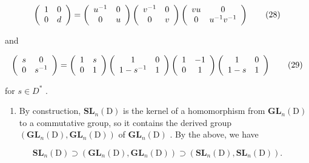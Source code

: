 \[
\left( \begin{array}{c c} 1 & 0 \\ 0 & d \end{array} \right) = \left( \begin{array}{c c} u ^ {- 1} & 0 \\ 0 & u \end{array} \right) \left( \begin{array}{c c} v ^ {- 1} & 0 \\ 0 & v \end{array} \right) \left( \begin{array}{c c} v u & 0 \\ 0 & u ^ {- 1} v ^ {- 1} \end{array} \right)\tag{28}
\]

and

\[
\left( \begin{array}{c c} s & 0 \\ 0 & s ^ {- 1} \end{array} \right) = \left( \begin{array}{c c} 1 & s \\ 0 & 1 \end{array} \right) \left( \begin{array}{c c} 1 & 0 \\ 1 - s ^ {- 1} & 1 \end{array} \right) \left( \begin{array}{c c} 1 & - 1 \\ 0 & 1 \end{array} \right) \left( \begin{array}{c c} 1 & 0 \\ 1 - s & 1 \end{array} \right)\tag{29}
\]

for \(s \in D^{*}\) .

\begin{enumerate}
\def\labelenumi{\Alph{enumi})}
\setcounter{enumi}{1}
\tightlist
\item
  By construction, \(\mathbf{SL}_{n}(\mathrm{D})\) is the kernel of a homomorphism from \(\mathbf{GL}_{n}(\mathrm{D})\) to a commutative group, so it contains the derived group \((\mathbf{GL}_{n}(\mathrm{D}),\mathbf{GL}_{n}(\mathrm{D}))\) of \(\mathbf{GL}_{n}(\mathrm{D})\) . By the above, we have
\end{enumerate}

\[
\mathbf {S L} _ {n} (\mathrm{D}) \supset (\mathbf {G L} _ {n} (\mathrm{D}), \mathbf {G L} _ {n} (\mathrm{D})) \supset (\mathbf {S L} _ {n} (\mathrm{D}), \mathbf {S L} _ {n} (\mathrm{D})).
\]

